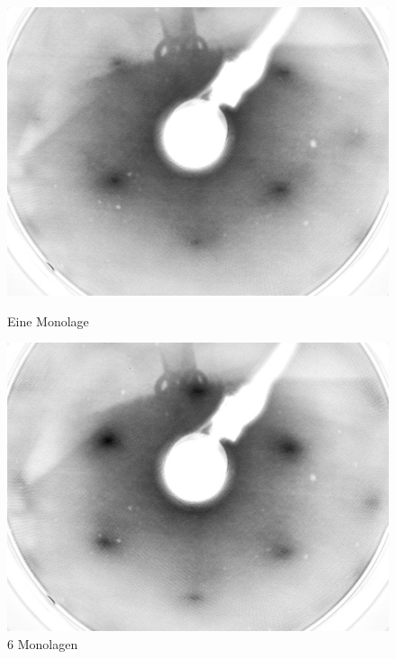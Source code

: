 \begin{figure}[htbp]
	\begin{minipage}[b]{0.4\textwidth} 
		\includegraphics[width=\textwidth]{LEED-Bilder/bearbeitet/1ML_E207}
		\caption{Eine Monolage}
		\label{Bild} 
	\end{minipage}
	\hfill
	\begin{minipage}[b]{0.4\textwidth}
		\includegraphics[width=\textwidth]{LEED-Bilder/bearbeitet/6ML_E207}
		\caption{6 Monolagen}
		\label{Bild} 
	\end{minipage}
	

\end{figure}
